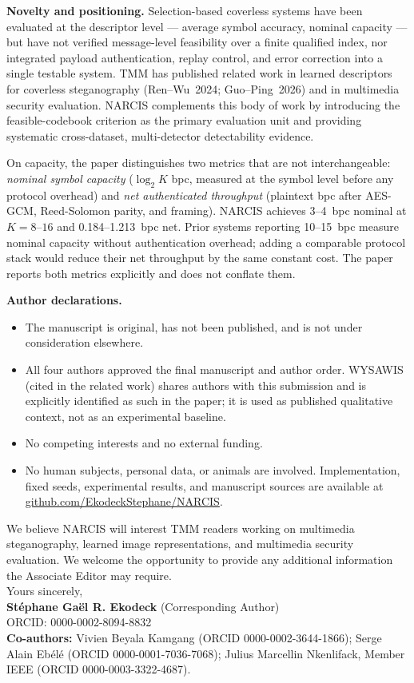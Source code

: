 \documentclass[10pt,letterpaper]{article}
\newcommand{\clhead}[1]{\textcolor{ieeeblue}{\textbf{#1}}}
\begin{document}
\clhead{Novelty and positioning.}
Selection-based coverless systems have been evaluated at the descriptor
level --- average symbol accuracy, nominal capacity --- but have not
verified message-level feasibility over a finite qualified index, nor
integrated payload authentication, replay control, and error correction
into a single testable system. TMM has published related work in
learned descriptors for coverless steganography (Ren--Wu~2024;
Guo--Ping~2026) and in multimedia security evaluation. NARCIS
complements this body of work by introducing the feasible-codebook
criterion as the primary evaluation unit and providing systematic
cross-dataset, multi-detector detectability evidence.

On capacity, the paper distinguishes two metrics that are not
interchangeable: \emph{nominal symbol capacity} ($\log_2 K$ bpc,
measured at the symbol level before any protocol overhead) and
\emph{net authenticated throughput} (plaintext bpc after AES-GCM,
Reed-Solomon parity, and framing). NARCIS achieves 3--4~bpc nominal at
$K{=}8$--$16$ and 0.184--1.213~bpc net. Prior systems reporting
10--15~bpc measure nominal capacity without authentication overhead;
adding a comparable protocol stack would reduce their net throughput by
the same constant cost. The paper reports both metrics explicitly and
does not conflate them.

\clhead{Author declarations.}
\begin{itemize}
\item The manuscript is original, has not been published, and is not
  under consideration elsewhere.
\item All four authors approved the final manuscript and author order.
  WYSAWIS (cited in the related work) shares authors with this
  submission and is explicitly identified as such in the paper; it is
  used as published qualitative context, not as an experimental
  baseline.
\item No competing interests and no external funding.
\item No human subjects, personal data, or animals are involved.
  Implementation, fixed seeds, experimental results, and manuscript
  sources are available at
  \href{https://github.com/EkodeckStephane/NARCIS}%
  {github.com/EkodeckStephane/NARCIS}.
\end{itemize}

We believe NARCIS will interest TMM readers working on multimedia
steganography, learned image representations, and multimedia security
evaluation. We welcome the opportunity to provide any additional
information the Associate Editor may require.\\[4pt]

Yours sincerely,\\[6pt]

\textbf{St\'ephane Ga\"el R. Ekodeck} (Corresponding Author)\\
ORCID: 0000-0002-8094-8832\\
\textbf{Co-authors:} Vivien Beyala Kamgang (ORCID 0000-0002-3644-1866);
Serge Alain Eb\'el\'e (ORCID 0000-0001-7036-7068);
Julius Marcellin Nkenlifack, Member IEEE (ORCID 0000-0003-3322-4687).
\end{document}
